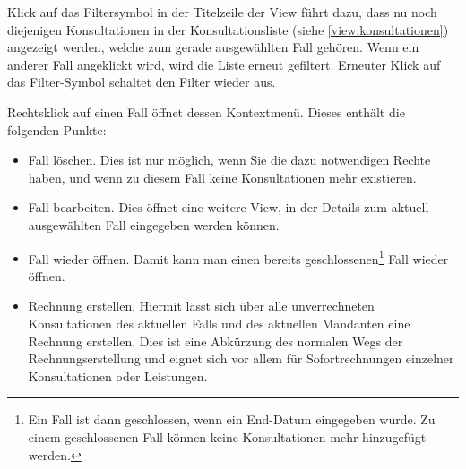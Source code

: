 \medskip

\label{filter:fall}
Klick auf das Filtersymbol in der Titelzeile der View führt dazu, dass nu noch diejenigen Konsultationen in der Konsultationsliste (siehe \ref{view:konsultationen}) angezeigt werden, welche zum gerade ausgewählten Fall gehören. Wenn ein anderer Fall angeklickt wird, wird die Liste erneut gefiltert. Erneuter Klick auf das Filter-Symbol schaltet den Filter wieder aus.

Rechtsklick auf einen Fall öffnet dessen Kontextmenü. Dieses enthält die
folgenden Punkte:
\begin{itemize}
  \item {Fall löschen}. Dies ist nur möglich, wenn Sie die dazu notwendigen Rechte
  haben, und wenn zu diesem Fall keine Konsultationen mehr existieren.
  \item {Fall bearbeiten}. Dies öffnet eine weitere View, in der Details zum
  aktuell ausgewählten Fall eingegeben werden können.
  \item {Fall wieder öffnen}. Damit kann man einen bereits
  geschlossenen\footnote{Ein Fall ist dann geschlossen, wenn ein End-Datum
  eingegeben wurde. Zu einem geschlossenen Fall können keine Konsultationen mehr
  hinzugefügt werden.} Fall wieder öffnen.
  \item {Rechnung erstellen}. Hiermit lässt sich über alle unverrechneten
  Konsultationen des aktuellen Falls und des aktuellen Mandanten eine Rechnung
  erstellen. Dies ist eine \glqq Abkürzung\grqq{} des normalen Wegs der
  Rechnungserstellung und eignet sich vor allem für Sofortrechnungen einzelner
  Konsultationen oder Leistungen.
\end{itemize}




